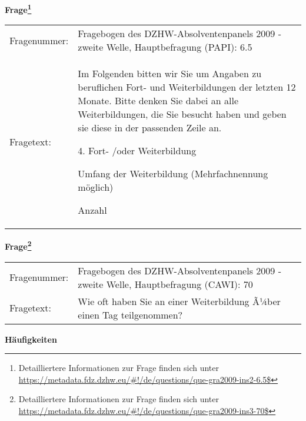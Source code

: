 				\vspace*{0.5cm}
                \noindent\textbf{Frage\footnote{Detailliertere Informationen zur Frage finden sich unter
		              \url{https://metadata.fdz.dzhw.eu/\#!/de/questions/que-gra2009-ins2-6.5$}}}\\
				\begin{tabularx}{\hsize}{@{}lX}
					Fragenummer: &
					  Fragebogen des DZHW-Absolventenpanels 2009 - zweite Welle, Hauptbefragung (PAPI):
					  6.5
 \\
					Fragetext: & Im Folgenden bitten wir Sie um Angaben zu beruflichen Fort- und Weiterbildungen der letzten 12 Monate. Bitte denken Sie dabei an alle Weiterbildungen, die Sie besucht haben und geben sie diese in der passenden Zeile an.\par  4. Fort- /oder Weiterbildung\par  Umfang der Weiterbildung (Mehrfachnennung möglich)\par  Anzahl \\
				\end{tabularx}
				\vspace*{0.5cm}
                \noindent\textbf{Frage\footnote{Detailliertere Informationen zur Frage finden sich unter
		              \url{https://metadata.fdz.dzhw.eu/\#!/de/questions/que-gra2009-ins3-70$}}}\\
				\begin{tabularx}{\hsize}{@{}lX}
					Fragenummer: &
					  Fragebogen des DZHW-Absolventenpanels 2009 - zweite Welle, Hauptbefragung (CAWI):
					  70
 \\
					Fragetext: & Wie oft haben Sie an einer Weiterbildung Ã¼ber einen Tag teilgenommen? \\
				\end{tabularx}





        		\vspace*{0.5cm}
                \noindent\textbf{Häufigkeiten}

